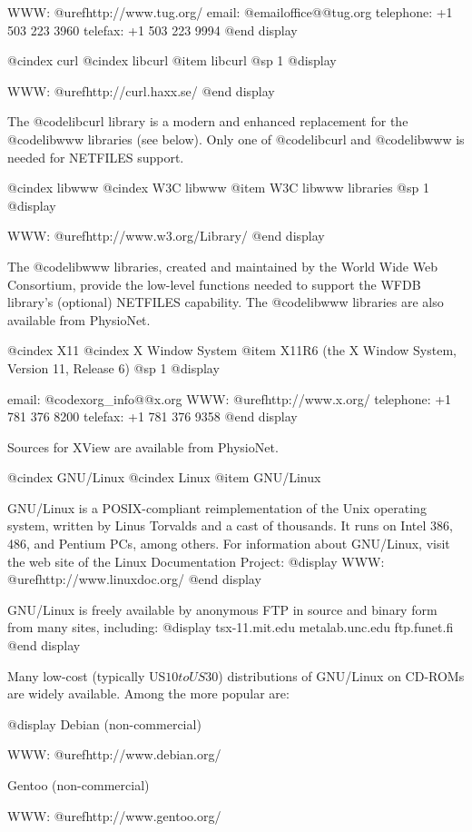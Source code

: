 {{{{{{{{{WWW: @uref{http://www.tug.org/}
email: @email{office@@tug.org}
telephone: +1 503 223 3960
telefax: +1 503 223 9994
@end display

@cindex curl
@cindex libcurl
@item libcurl
@sp 1
@display

WWW: @uref{http://curl.haxx.se/}
@end display

The @code{libcurl} library is a modern and enhanced replacement for the
@code{libwww} libraries (see below).  Only one of @code{libcurl} and
@code{libwww} is needed for NETFILES support.

@cindex libwww
@cindex W3C libwww
@item W3C libwww libraries
@sp 1
@display

WWW: @uref{http://www.w3.org/Library/}
@end display

The @code{libwww} libraries, created and maintained by the World Wide
Web Consortium, provide the low-level functions needed to support
the WFDB library's (optional) NETFILES capability.  The @code{libwww}
libraries are also available from PhysioNet.

@cindex X11
@cindex X Window System
@item X11R6 (the X Window System, Version 11, Release 6)
@sp 1
@display

email: @code{xorg_info@@x.org}
WWW: @uref{http://www.x.org/}
telephone: +1 781 376 8200
telefax: +1 781 376 9358
@end display

Sources for XView are available from PhysioNet.

@cindex GNU/Linux
@cindex Linux
@item GNU/Linux

GNU/Linux is a POSIX-compliant reimplementation of the Unix operating system,
written by Linus Torvalds and a cast of thousands.  It runs on Intel 386,
486, and Pentium PCs, among others.  For information about GNU/Linux, visit
the web site of the Linux Documentation Project:
@display
WWW: @uref{http://www.linuxdoc.org/}
@end display

GNU/Linux is freely available by anonymous FTP in source and binary form from
many sites, including:
@display
tsx-11.mit.edu
metalab.unc.edu
ftp.funet.fi
@end display

Many low-cost (typically US$10 to US$30) distributions of GNU/Linux on CD-ROMs
are widely available.  Among the more popular are:

@display
Debian (non-commercial)

WWW: @uref{http://www.debian.org/}


Gentoo (non-commercial)

WWW: @uref{http://www.gentoo.org/}


}}}}}}}}}
